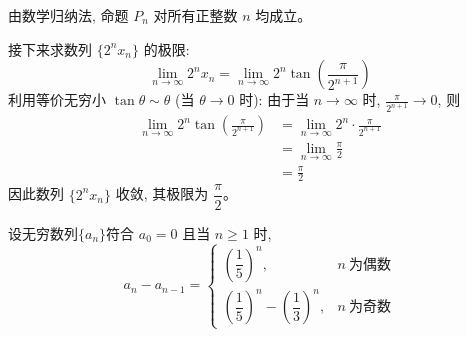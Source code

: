 \begin{questions}
\begin{solution}
        由数学归纳法, 命题 $P_n$ 对所有正整数 $n$ 均成立。

        接下来求数列 $\{2^n x_n\}$ 的极限:
        \[
        \lim_{n\to\infty} 2^n x_n = \lim_{n\to\infty} 2^n \tan\left(\frac{\pi}{2^{n+1}}\right)
        \]
        利用等价无穷小 $\tan \theta \sim \theta$ (当 $\theta \to 0$ 时):
        由于当 $n \to \infty$ 时, $\frac{\pi}{2^{n+1}} \to 0$, 则
        \begin{align}
        \lim_{n\to\infty} 2^n \tan\left(\frac{\pi}{2^{n+1}}\right) &= \lim_{n\to\infty} 2^n \cdot \frac{\pi}{2^{n+1}} \\
        &= \lim_{n\to\infty} \frac{\pi}{2} \\
        &= \frac{\pi}{2}
        \end{align}
        因此数列 $\{2^n x_n\}$ 收敛, 其极限为 $\dfrac{\pi}{2}$。
    \end{solution}

    \question 设无穷数列$\{a_n\}$符合 $a_0=0$ 且当 $n \ge 1$ 时,
    \[
    a_n - a_{n-1} =
    \begin{cases}
    \left(\dfrac{1}{5}\right)^n, & n \:\text{为偶数} \\[2mm]
    \left(\dfrac{1}{5}\right)^n - \left(\dfrac{1}{3}\right)^n, & n \:\text{为奇数}
    \end{cases}
    \]
\end{questions}
